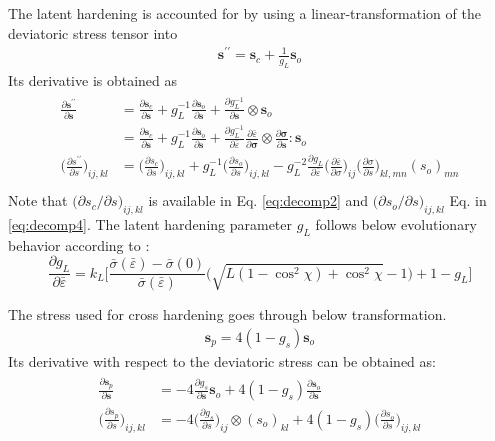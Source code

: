 \documentclass[12pt]{amsart}
\begin{document}
The latent hardening is accounted for by using a linear-transformation of the deviatoric stress tensor into
\begin{eqnarray}
  \label{eq:latent_decompose1}
  \mathbf{s}^{\prime\prime}=\mathbf{s}_c+\frac{1}{g_L}\mathbf{s}_o
\end{eqnarray}
Its derivative is obtained as
\begin{eqnarray}
  \begin{split}
    \label{eq:latent_decompose2}
    \frac{\partial\mathbf{s}^{\prime\prime}}{\partial\mathbf{s}} &=\frac{\partial\mathbf{s}_c}{\partial\mathbf{s}} + g_L^{-1} \frac{\partial\mathbf{s}_o}{\partial\mathbf{s}}+\frac{\partial g_L^{-1}}{\partial\mathbf{s}}\otimes\mathbf{s}_o\\
    &=\frac{\partial\mathbf{s}_c}{\partial\mathbf{s}} + g_L^{-1} \frac{\partial\mathbf{s}_o}{\partial\mathbf{s}}+\frac{\partial g_L^{-1}}{\partial\bar{\varepsilon}}\frac{\partial\bar{\varepsilon}}{\partial\mathbf{\sigma}}\otimes \frac{\partial\mathbf{\sigma}}{\partial\mathbf{s}}:\mathbf{s}_o \\
    \bigg(\frac{\partial s^{\prime\prime}}{\partial s}\bigg)_{ij,kl} &=\bigg( \frac{\partial s_c}{\partial s}\bigg)_{ij,kl} + g_L^{-1} \bigg(\frac{\partial s_o}{\partial s}\bigg)_{ij,kl}-g_L^{-2}\frac{\partial g_L}{\partial\bar{\varepsilon}}\bigg(\frac{\partial\bar{\varepsilon}}{\partial\sigma}\bigg)_{ij}\bigg(\frac{\partial\sigma}{\partial s}\bigg)_{kl,mn}(s_o)_{mn} \\
  \end{split}
\end{eqnarray}
Note that $\big(\partial s_c / \partial s\big)_{ij,kl}$ is available in Eq. \ref{eq:decomp2} and $\big(\partial s_o/\partial s\big)_{ij,kl}$ Eq. in \ref{eq:decomp4}.
The latent hardening parameter $g_L$ follows below evolutionary behavior according to \cite{barlat2011alternative}:
\begin{equation}
  \label{eq:latent_deriv}
\frac{\partial g_L}{\partial\bar{\varepsilon}} = k_L\bigg[\frac{\bar{\sigma}(\bar{\varepsilon})-\bar{\sigma}(0)}{\bar{\sigma}(\bar{\varepsilon})}\Big(\sqrt{L(1-\cos^2\chi)+\cos^2\chi}-1\Big)+1-g_L\bigg]
\end{equation}


The stress used for cross hardening goes through below transformation.
\begin{eqnarray}
  \label{eq:cross_linear1}
  \mathbf{s}_p = 4(1-g_s)\mathbf{s}_o
\end{eqnarray}
Its derivative with respect to the deviatoric stress can be obtained as:
\begin{eqnarray}
  \begin{split}
    \label{eq:cross_linear2}
    \frac{\partial\mathbf{s}_p}{\partial\mathbf{s}}                 &= -4 \frac{\partial g_s}{\partial\mathbf{s}} \mathbf{s}_o + 4(1-g_s) \frac{\partial\mathbf{s}_o}{\partial\mathbf{s}} \\
    \bigg(\frac{\partial s_p}{\partial s} \bigg)_{ij,kl} &= -4 \bigg(\frac{\partial g_s}{\partial s}\bigg)_{ij}\otimes (s_o)_{kl} + 4(1-g_s) \bigg(\frac{\partial s_o}{\partial s}\bigg)_{ij,kl}
  \end{split}
\end{eqnarray}
\end{document}
